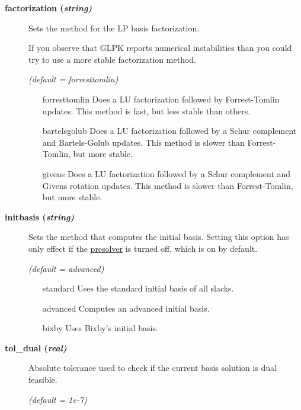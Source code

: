 \begin{description}
\item[\label{factorization}\hypertarget{factorization}
{\textbf{factorization (\slshape{string})}}]\hspace{1.0in}

Sets the method for the LP basis factorization.

If you observe that GLPK reports numerical instabilities than you could try to use a more stable factorization method.

\textsl{(default = forresttomlin)}
\begin{itemize}
\item[forresttomlin] 
Does a LU factorization followed by Forrest-Tomlin updates.
This method is fast, but less stable than others.
\item[bartelsgolub] 
Does a LU factorization followed by a Schur complement and Bartels-Golub updates.
This method is slower than Forrest-Tomlin, but more stable.
\item[givens] 
Does a LU factorization followed by a Schur complement and Givens rotation updates.
This method is slower than Forrest-Tomlin, but more stable.
\end{itemize}

\item[\label{initbasis}\hypertarget{initbasis}
{\textbf{initbasis (\slshape{string})}}]\hspace{1.0in}

Sets the method that computes the initial basis.
Setting this option has only effect if the \hyperlink{presolve}{presolver} is turned off, which is on by default.

\textsl{(default = advanced)}
\begin{itemize}
\item[standard] 
Uses the standard initial basis of all slacks.
\item[advanced] 
Computes an advanced initial basis.
\item[bixby] 
Uses Bixby's initial basis.
\end{itemize}

\item[\label{glpktol_dual}\hypertarget{glpktol_dual}
{\textbf{tol\_dual (\slshape{real})}}]\hspace{1.0in}

Absolute tolerance used to check if the current basis solution is dual feasible.

\textsl{(default = 1e-7)}


\end{description}
